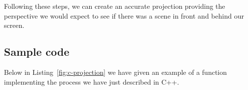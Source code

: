 Following these steps, we can create an accurate projection providing the perspective we would expect to see if there was a scene in front and behind our screen. 

\subsection{Sample code}
Below in Listing~\ref{fig:c-projection} we have given an example of a function implementing the process we have just described in C++.

